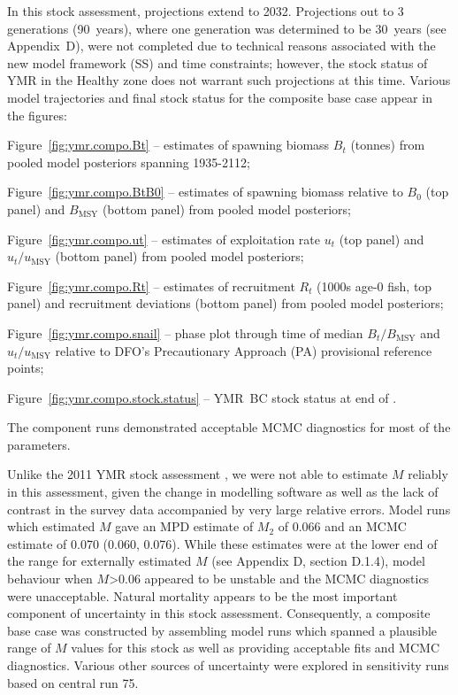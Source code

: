 \documentclass[11pt]{book}
\newcommand{\Bmsy}{B_\mathrm{MSY}}
\newcommand{\umsy}{u_\mathrm{MSY}}
\begin{document}
In this stock assessment, projections extend to 2032. 
Projections out to 3 generations (90~years), where one generation was determined to be 30~years (see Appendix~D), were not completed due to technical reasons associated with the new model framework (SS) and time constraints; however, the stock status of YMR in the Healthy zone does not warrant such projections at this time.
Various model trajectories and final stock status for the composite base case appear in the figures:
\vspace{-0.5\baselineskip}%
\begin{itemize_csas}
  \item Figure~\ref{fig:ymr.compo.Bt}     -- estimates of spawning biomass $B_t$ (tonnes) from pooled model posteriors spanning 1935-2112;
  \item Figure~\ref{fig:ymr.compo.BtB0}   -- estimates of spawning biomass relative to $B_0$ (top panel) and $\Bmsy$ (bottom panel) from pooled model posteriors;
  \item Figure~\ref{fig:ymr.compo.ut}     -- estimates of exploitation rate $u_t$ (top panel) and $u_t/\umsy$ (bottom panel) from pooled model posteriors;
  \item Figure~\ref{fig:ymr.compo.Rt}     -- estimates of recruitment $R_t$ (1000s age-0 fish, top panel) and recruitment deviations (bottom panel) from pooled model posteriors;
  \item Figure~\ref{fig:ymr.compo.snail}  -- phase plot through time of median $B_t/\Bmsy$ and $u_t/\umsy$ relative to DFO's Precautionary Approach (PA) provisional reference points;
  \item Figure~\ref{fig:ymr.compo.stock.status} -- YMR~BC stock status at end of \currYear{}.
\end{itemize_csas}

The  component runs demonstrated acceptable MCMC diagnostics for most of the parameters.

Unlike the 2011 YMR stock assessment \citep{Edwards-etal:2012_ymr}, we were not able to estimate $M$ reliably in this assessment, given the change in modelling software as well as the lack of contrast in the survey data accompanied by very large relative errors.
Model runs which estimated $M$ gave an MPD estimate of $M_2$ of 0.066 and an MCMC estimate of 0.070 (0.060, 0.076).
While these estimates were at the lower end of the range for externally estimated $M$ (see Appendix D, section D.1.4), model behaviour when $M$>0.06 appeared to be unstable and the MCMC diagnostics were unacceptable.
Natural mortality appears to be the most important component of uncertainty in this stock assessment.
Consequently, a composite base case was constructed by assembling model runs which spanned a plausible range of $M$ values for this stock as well as providing acceptable fits and MCMC diagnostics.
Various other sources of uncertainty were explored in sensitivity runs based on central run 75.
\end{document}
